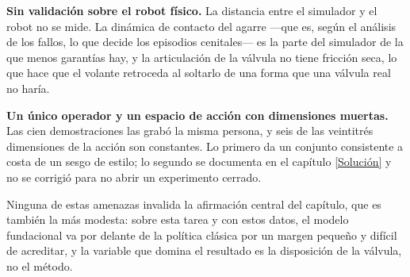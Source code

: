 \textbf{Sin validación sobre el robot físico.} La distancia entre el simulador y el robot no se mide. La dinámica de
contacto del agarre —que es, según el análisis de los fallos, lo que decide los episodios
cenitales— es la parte del simulador de la que menos garantías hay, y la articulación de la válvula
no tiene fricción seca, lo que hace que el volante retroceda al soltarlo de una forma que una
válvula real no haría.

\textbf{Un único operador y un espacio de acción con dimensiones muertas.} Las cien demostraciones
las grabó la misma persona, y seis de las veintitrés dimensiones de la acción son constantes. Lo
primero da un conjunto consistente a costa de un sesgo de estilo; lo segundo se documenta en el
capítulo \ref{Solución} y no se corrigió para no abrir un experimento cerrado.

Ninguna de estas amenazas invalida la afirmación central del capítulo, que es también la más
modesta: sobre esta tarea y con estos datos, el modelo fundacional va por delante de la política
clásica por un margen pequeño y difícil de acreditar, y la variable que domina el resultado es la
disposición de la válvula, no el método.
